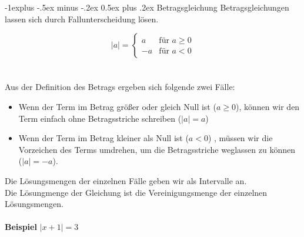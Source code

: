 \documentclass[a4paper,10pt]{article}
\makeatletter
\renewcommand{\subsection}{\@startsection{subsection}{2}{0mm}%
                                {-1explus -.5ex minus -.2ex}%
                                {0.5ex plus .2ex}%
                                {\normalfont\normalsize\bfseries}}
\makeatother
\begin{document}
\begin{multicols}{3}
    \subsection{Betragsgleichung}
    Betragsgleichungen lassen sich durch Fallunterscheidung lösen.

    \begin{equation*} |a| = \begin{cases} a &\text{für } a \geq 0 \\[5px] -a &\text{für } a < 0 \end{cases} \end{equation*}\\~\\
    Aus der Definition des Betrags ergeben sich folgende zwei Fälle: \\
    \begin{itemize}
        \item Wenn der Term im Betrag größer oder gleich Null ist ($a \geq 0$), können wir den Term einfach ohne Betragsstriche schreiben ($|a| = a$)
        \item Wenn der Term im Betrag kleiner als Null ist ($a < 0$) , müssen wir die Vorzeichen des Terms umdrehen, um die Betragsstriche weglassen zu können ($|a| = -a$).
    \end{itemize}
    Die Lösungsmengen der einzelnen Fälle geben wir als Intervalle an. \\
    Die Lösungmenge der Gleichung ist die Vereinigungsmenge der einzelnen Lösungsmengen.\\~\\
    \textbf{Beispiel} $|x + 1| = 3$\\~\\


\end{multicols}
\end{document}
